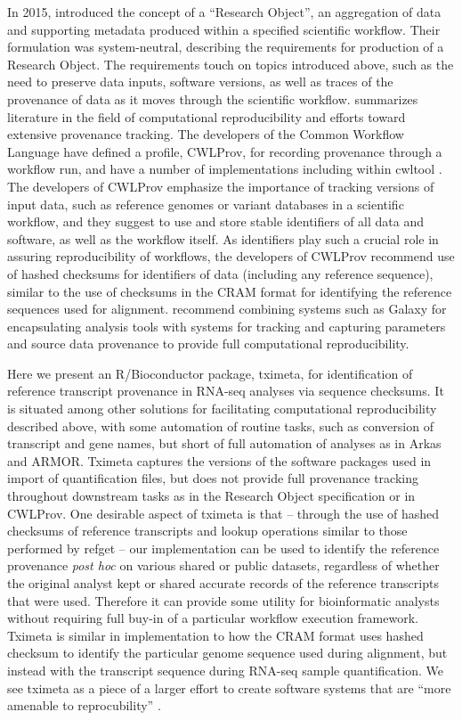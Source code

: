 \documentclass[12pt]{article}
\begin{document}
In 2015, \citet{Belhajjame2015} introduced the concept of a ``Research Object'', an aggregation of data and supporting metadata produced within a specified scientific workflow. Their formulation was system-neutral, describing the requirements for production of a Research Object. The requirements touch on topics introduced above, such as the need to preserve data inputs, software versions, as well as traces of the provenance of data as it moves through the scientific workflow. \citet{Belhajjame2015} summarizes literature in the field of computational reproducibility and efforts toward extensive provenance tracking. The developers of the Common Workflow Language \citep{cwl} have defined a profile, CWLProv, for recording provenance through a workflow run, and have a number of implementations including within cwltool \citep{Khan2018}. The developers of CWLProv emphasize the importance of tracking versions of input data, such as reference genomes or variant databases in a scientific workflow, and they suggest to use and store stable identifiers of all data and software, as well as the workflow itself. As identifiers play such a crucial role in assuring reproducibility of workflows, the developers of CWLProv recommend use of hashed checksums for identifiers of data (including any reference sequence), similar to the use of checksums in the CRAM format for identifying the reference sequences used for alignment. \citet{Gruning2018} recommend combining systems such as Galaxy for encapsulating analysis tools with systems for tracking and capturing parameters and source data provenance to provide full computational reproducibility.

Here we present an R/Bioconductor package, tximeta, for identification of reference transcript provenance in RNA-seq analyses via sequence checksums. It is situated among other solutions for facilitating computational reproducibility described above, with some automation of routine tasks, such as conversion of transcript and gene names, but short of full automation of analyses as in Arkas and ARMOR. Tximeta captures the versions of the software packages used in import of quantification files, but does not provide full provenance tracking throughout downstream tasks as in the Research Object specification or in CWLProv. One desirable aspect of tximeta is that -- through the use of hashed checksums of reference transcripts and lookup operations similar to those performed by refget -- our implementation can be used to identify the reference provenance \textit{post hoc} on various shared or public datasets, regardless of whether the original analyst kept or shared accurate records of the reference transcripts that were used. Therefore it can provide some utility for bioinformatic analysts without requiring full buy-in of a particular workflow execution framework. Tximeta is similar in implementation to how the CRAM format uses hashed checksum to identify the particular genome sequence used during alignment, but instead with the transcript sequence during RNA-seq sample quantification. We see tximeta as a piece of a larger effort to create software systems that are ``more amenable to reprocubility'' \citep{Peng2011}.
\end{document}
